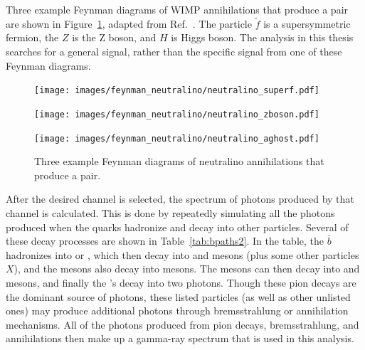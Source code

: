     Three example Feynman diagrams of WIMP annihilations that produce a \bbbar pair are shown in Figure~\ref{fig:neutralino_feynman}, adapted from Ref.~\cite{Jungman:1995df}.
    The particle $\tilde{f}$ is a supersymmetric fermion, the $Z$ is the Z boson, and $H$ is Higgs boson.
    The analysis in this thesis searches for a general \bbbar signal, rather than the specific signal from one of these Feynman diagrams.
    
    \begin{figure}[h]
      \centering
      \hfill
      \begin{minipage}{0.17\textwidth}\texttt{[image: images/feynman\_neutralino/neutralino\_superf.pdf]}\end{minipage}\hfill
      \begin{minipage}{0.25\textwidth}\texttt{[image: images/feynman\_neutralino/neutralino\_zboson.pdf]}\end{minipage}\hfill
      \begin{minipage}{0.25\textwidth}\texttt{[image: images/feynman\_neutralino/neutralino\_aghost.pdf]}\end{minipage}\hfill
      \hfill
      \caption[WIMP Annihilation Feynman Diagrams]{
        Three example Feynman diagrams of neutralino annihilations that produce a \bbbar pair.
      }
      \label{fig:neutralino_feynman}
    \end{figure}

    After the desired channel is selected, the spectrum of photons produced by that channel is calculated.
    This is done by repeatedly simulating all the photons produced when the \bbbar quarks hadronize and decay into other particles.
    Several of these decay processes are shown in Table~\ref{tab:bpaths2}.
    In the table, the $\bar{b}$ hadronizes into \PBplus or \PBzero, which then decay into \PK and \PD mesons (plus some other particles $X$), and the \PD mesons also decay into \PK mesons.
    The \PK mesons can then decay into \Ppipm and \Ppizero mesons, and finally the \Ppizero{}'s decay into two photons.
    Though these pion decays are the dominant source of photons, these listed particles (as well as other unlisted ones) may produce additional photons through bremsstrahlung or annihilation mechanisms.
    All of the photons produced from pion decays, bremsstrahlung, and annihilations then make up a gamma-ray spectrum that is used in this analysis.
    
